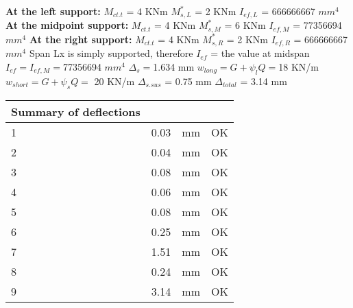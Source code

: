 \documentclass{article}%
\begin{document}
%
\newline%
\newline%
%
\textbf{At the left support:}%
\newline%
\newline%
%
$M_{ct.t}$ = 4 KNm%
\newline%
%
$M_{s,L}^{*}$ = 2 KNm%
\newline%
%
$I_{ef,L}$ = 666666667 $mm^{4}$%
\newline%
\newline%
%
\textbf{At the midpoint support:}%
\newline%
\newline%
%
$M_{ct.t}$ = 4 KNm%
\newline%
%
$M_{s,M}^{*}$ = 6 KNm%
\newline%
%
$I_{ef,M}$ = 77356694 $mm^{4}$%
\newline%
\newline%
%
\textbf{At the right support:}%
\newline%
\newline%
%
$M_{ct.t}$ = 4 KNm%
\newline%
%
$M_{s,R}^{*}$ = 2 KNm%
\newline%
%
$I_{ef,R}$ = 666666667 $mm^{4}$%
\newline%
\newline%
%
Span Lx is simply supported, therefore $I_{ef}$ = the value at midspan%
\newline%
\newline%
%
$I_{ef} = I_{ef,M} = $77356694 $ mm^{4}$%
\newline%
\newline%
%
$\Delta_{s} =$1.634 mm%
\newline%
\newline%
%
$w_{long} = G + \psi_{l}Q = $18 KN/m%
\newline%
%
$w_{short} = G + \psi_{s}Q = $ 20 KN/m%
\newline%
\newline%
%
$\Delta_{s.sus}$ = 0.75 mm%
\newline%
\newline%
%
$\Delta_{total}$ = 3.14 mm%
\newline%
\newline%
%
\begin{tabular}{llll}%
Summary of deflections&&&\\%
\hline%
1&0.03& mm&OK\\%
2&0.04& mm&OK\\%
3&0.08& mm&OK\\%
4&0.06& mm&OK\\%
5&0.08& mm&OK\\%
6&0.25& mm&OK\\%
7&1.51& mm&OK\\%
8&0.24& mm&OK\\%
9&3.14& mm&OK\\%
\end{tabular}%
\end{document}
